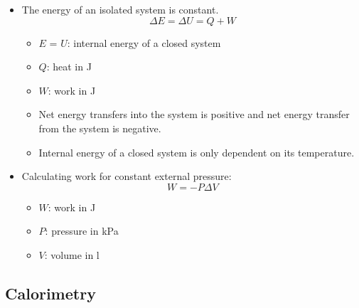 \documentclass{article}
\begin{document}
\begin{itemize}
    \item The energy of an isolated system is constant.
    \begin{equation*}
        \Delta E = \Delta U = Q + W
    \end{equation*}
    \begin{itemize}
        \item $E$ = $U$: internal energy of a closed system
        \item $Q$: heat in \si{\joule}
        \item $W$: work in \si{\joule}
        \item Net energy transfers into the system is positive and net energy transfer from the system is negative.
        \item Internal energy of a closed system is only dependent on its temperature.
    \end{itemize}
    \item Calculating work for constant external pressure:
    \begin{equation*}
        W = -P \Delta V
    \end{equation*}
    \begin{itemize}
        \item $W$: work in \si{\joule}
        \item $P$: pressure in \si{\kilo\pascal}
        \item $V$: volume in \si{\litre}
    \end{itemize}
\end{itemize}

\subsection{Calorimetry}
\end{document}
